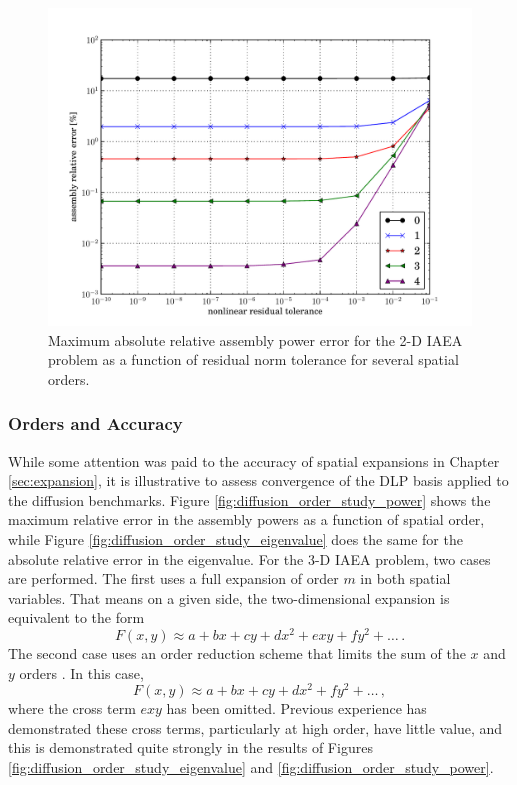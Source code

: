 \begin{figure}[ht]
    \centering
    \includegraphics[keepaspectratio, width = 3.5 in]
                    {tolerance_study_power}
    \caption{Maximum absolute relative assembly power error for the 2-D IAEA 
             problem as a function of 
             residual norm tolerance for several spatial orders.}
    \label{fig:tolerance_study_power}
\end{figure}

\subsubsection{Orders and Accuracy}
\label{sec:diffusion_order_accuracy}

While some attention was paid to the accuracy of spatial expansions in 
Chapter \ref{sec:expansion}, it is illustrative to assess convergence 
of the DLP basis applied to the diffusion benchmarks.  
Figure \ref{fig:diffusion_order_study_power}
 shows the maximum relative error in the assembly 
powers as a function of spatial order, while Figure 
\ref{fig:diffusion_order_study_eigenvalue} does 
the same for the absolute relative error in the eigenvalue.  For the 
3-D IAEA problem, two cases are performed.  The first uses a full 
expansion of order $m$ in both spatial variables.  That means on a given 
side, the two-dimensional expansion is equivalent to the form 
\begin{equation}
 F(x, y) \approx a + bx + cy + d x^2 + e xy + f y^2 + \ldots \, .
\end{equation}
The second case uses an order reduction scheme that 
limits the sum of the $x$ and $y$ orders \cite{forget2006tdh}.  In this case,
\begin{equation}
 F(x, y) \approx a + bx + cy + d x^2 + f y^2 + \ldots \, ,
\end{equation}
where the cross term $e xy$ has been omitted.  Previous experience 
has demonstrated these cross terms, particularly at high order, have 
little value, and this is demonstrated quite strongly in the results
of Figures \ref{fig:diffusion_order_study_eigenvalue} 
and \ref{fig:diffusion_order_study_power}.

